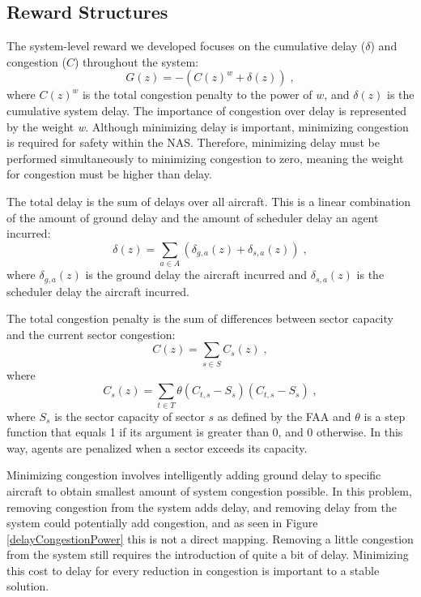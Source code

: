 \documentclass{aamas2014}
\begin{document}
\subsection{Reward Structures}

The system-level reward we developed focuses on the cumulative delay ($\delta$) and congestion ($C$) throughout the system:
%
\begin{equation} \label{eq:Global}
G(z) = -(C(z)^w + \delta(z))\;,
\end{equation}
%
where $C(z)^w$ is the total congestion penalty to the power of $w$, and $\delta(z)$ is the cumulative system delay. The importance of congestion over delay is represented by the weight \textit{w}. Although minimizing delay is important, minimizing congestion is required for safety within the NAS. Therefore, minimizing delay must be performed simultaneously to minimizing congestion to zero, meaning the weight for congestion must be higher than delay.

The total delay is the sum of delays over all aircraft. This is a linear combination of the amount of ground delay and the amount of scheduler delay an agent incurred:
%
\begin{equation} \label{eq:Cumilative Delay}
\delta(z) = \displaystyle\sum\limits_{a \in A} (\delta_{g,a}(z) + \delta_{s,a}(z))\;,
\end{equation}
%
where $\delta_{g,a}(z)$ is the ground delay the aircraft incurred and $\delta_{s,a}(z)$ is the scheduler delay the aircraft incurred. 

The total congestion penalty is the sum of differences between sector capacity and the current sector congestion:
%
\begin{equation} \label{eq:Cumilative Congestion}
C(z) = \displaystyle\sum\limits_{s \in S} C_s(z)\;,
\end{equation}
%
where
%
\begin{equation}
C_s(z) = \displaystyle\sum\limits_{t \in T} \theta(C_{t,s} - S_s) (C_{t,s} - S_s)\;,
\end{equation}
%
where $S_s$ is the sector capacity of sector $s$ as defined by the FAA and $\theta$ is a step function that equals 1 if its argument is greater than 0, and 0 otherwise. In this way, agents are penalized when a sector exceeds its capacity.

Minimizing congestion involves intelligently adding ground delay to specific aircraft to obtain smallest amount of system congestion possible. In this problem, removing congestion from the system adds delay, and removing delay from the system could potentially add congestion, and as seen in Figure \ref{delayCongestionPower} this is not a direct mapping. Removing a little congestion from the system still requires the introduction of quite a bit of delay. Minimizing this cost to delay for every reduction in congestion is important to a stable solution.
\end{document}
